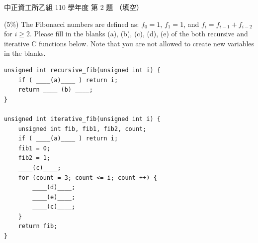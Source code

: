 \begin{pastexam}[label={px:ccu-110-csb-02}]{中正資工所乙組 110 學年度 第 2 題}
（填空）

(5\%) The Fibonacci numbers are defined as: $f_0=1$, $f_1=1$, and $f_i=f_{i-1}+f_{i-2}$ for
$i\ge 2$. Please fill in the blanks (a), (b), (c), (d), (e) of the both recursive and iterative C
functions below. Note that you are not allowed to create new variables in the blanks.
\begin{verbatim}
unsigned int recursive_fib(unsigned int i) {
    if ( ____(a)____ ) return i;
    return ____ (b) ____;
}

unsigned int iterative_fib(unsigned int i) {
    unsigned int fib, fib1, fib2, count;
    if ( ____(a)____ ) return i;
    fib1 = 0;
    fib2 = 1;
    ____(c)____;
    for (count = 3; count <= i; count ++) {
        ____(d)____;
        ____(e)____;
        ____(c)____;
    }
    return fib;
}
\end{verbatim}
\end{pastexam}

